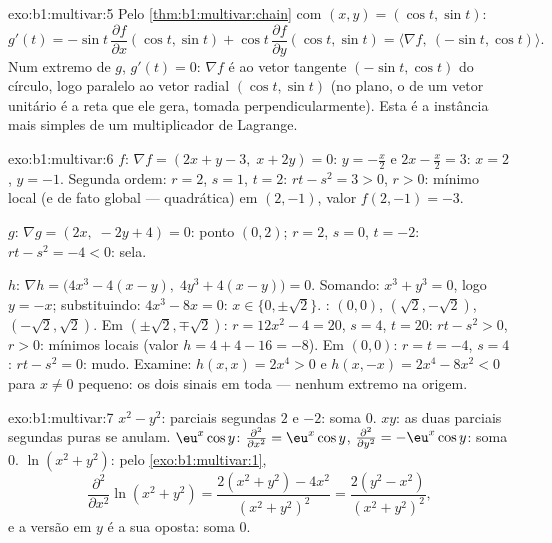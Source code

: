 \begin{solution}{exo:b1:multivar:5}
Pelo \cref{thm:b1:multivar:chain} com $(x, y) = (\cos t, \sin t)$:
\[
g'(t) = -\sin t\,\frac{\partial f}{\partial x}(\cos t, \sin t)
+ \cos t\,\frac{\partial f}{\partial y}(\cos t, \sin t)
= \bigl\langle \nabla f,\ (-\sin t, \cos t)\bigr\rangle .
\]
Num extremo de $g$, $g'(t) = 0$: $\nabla f$ é  ao vetor tangente $(-\sin t, \cos t)$
do círculo, logo paralelo ao vetor radial $(\cos t, \sin t)$ (no plano, o
 de um vetor unitário é a reta que ele gera,
tomada perpendicularmente). Esta é a instância mais simples de um
multiplicador de Lagrange.
\end{solution}

\begin{solution}{exo:b1:multivar:6}
$f$: $\nabla f = (2x + y - 3,\; x + 2y) = 0$: $y = -\frac x2$ e $2x - \frac x2 = 3$: $x = 2$, $y = -1$. Segunda ordem: $r = 2$,
$s = 1$, $t = 2$: $rt - s^2 = 3 > 0$, $r > 0$: mínimo local (e de fato global ---
quadrática) em $(2, -1)$, valor $f(2,-1) = -3$.

$g$: $\nabla g = (2x,\; -2y + 4) = 0$: ponto $(0, 2)$; $r = 2$, $s = 0$, $t = -2$: $rt - s^2 = -4 < 0$: sela.

$h$: $\nabla h = \bigl(4x^3 - 4(x - y),\; 4y^3 + 4(x-y)\bigr) = 0$. Somando: $x^3 + y^3 = 0$, logo $y = -x$; substituindo: $4x^3 - 8x = 0$: $x \in \{0, \pm\sqrt2\}$.
: $(0,0)$, $(\sqrt2, -\sqrt2)$, $(-\sqrt2, \sqrt2)$. Em $(\pm\sqrt2, \mp\sqrt2)$: $r = 12x^2 - 4 = 20$, $s = 4$,
$t = 20$: $rt - s^2 > 0$, $r > 0$: mínimos locais (valor $h = 4 + 4 - 16 =
-8$). Em $(0,0)$:
$r = t = -4$, $s = 4$: $rt - s^2 = 0$: mudo. Examine: $h(x, x) = 2x^4 > 0$ e $h(x, -x) = 2x^4 - 8x^2 < 0$ para $x \neq 0$
pequeno: os dois sinais em toda  --- nenhum extremo na
origem.
\end{solution}

\begin{solution}{exo:b1:multivar:7}
$x^2 - y^2$: parciais segundas $2$ e $-2$: soma $0$. $xy$: as duas parciais
segundas puras se anulam. $\eu^x\cos y$: $\frac{\partial^2}{\partial
x^2} = \eu^x\cos y$, $\frac{\partial^2}{\partial y^2} =
-\eu^x\cos y$: soma $0$. $\ln(x^2+y^2)$: pelo
\cref{exo:b1:multivar:1},
\[
\frac{\partial^2}{\partial x^2}\ln(x^2+y^2)
= \frac{2(x^2+y^2) - 4x^2}{(x^2+y^2)^2}
= \frac{2(y^2 - x^2)}{(x^2+y^2)^2},
\]
e a versão em $y$ é a sua oposta: soma $0$.
\end{solution}

